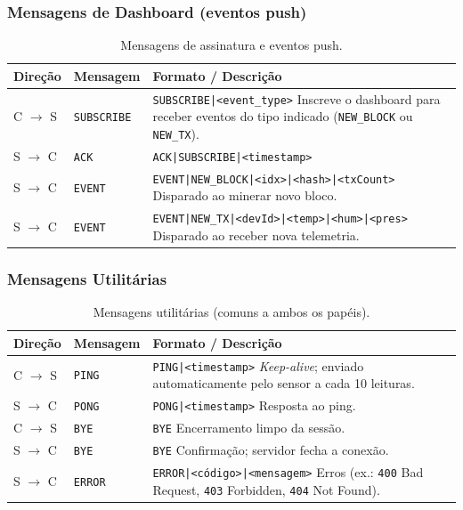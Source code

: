 \documentclass[12pt, a4paper]{article}
\begin{document}
\subsubsection{Mensagens de Dashboard (eventos push)}

\begin{table}[H]
\centering
\caption{Mensagens de assinatura e eventos push.}
\label{tab:dash-push}
\begin{tabularx}{\linewidth}{llX}
\toprule
\textbf{Direção} & \textbf{Mensagem} & \textbf{Formato / Descrição} \\
\midrule
C $\to$ S & \texttt{SUBSCRIBE}  & \texttt{SUBSCRIBE|<event\_type>} \newline Inscreve o dashboard para receber eventos do tipo indicado (\texttt{NEW\_BLOCK} ou \texttt{NEW\_TX}). \\
\addlinespace
S $\to$ C & \texttt{ACK}        & \texttt{ACK|SUBSCRIBE|<timestamp>} \\
\addlinespace
S $\to$ C & \texttt{EVENT}      & \texttt{EVENT|NEW\_BLOCK|<idx>|<hash>|<txCount>} \newline Disparado ao minerar novo bloco. \\
\addlinespace
S $\to$ C & \texttt{EVENT}      & \texttt{EVENT|NEW\_TX|<devId>|<temp>|<hum>|<pres>} \newline Disparado ao receber nova telemetria. \\
\bottomrule
\end{tabularx}
\end{table}

\subsubsection{Mensagens Utilitárias}

\begin{table}[H]
\centering
\caption{Mensagens utilitárias (comuns a ambos os papéis).}
\label{tab:util-msgs}
\begin{tabularx}{\linewidth}{llX}
\toprule
\textbf{Direção} & \textbf{Mensagem} & \textbf{Formato / Descrição} \\
\midrule
C $\to$ S & \texttt{PING}  & \texttt{PING|<timestamp>} \newline \emph{Keep-alive}; enviado automaticamente pelo sensor a cada 10 leituras. \\
S $\to$ C & \texttt{PONG}  & \texttt{PONG|<timestamp>} \newline Resposta ao ping. \\
\addlinespace
C $\to$ S & \texttt{BYE}   & \texttt{BYE} \newline Encerramento limpo da sessão. \\
S $\to$ C & \texttt{BYE}   & \texttt{BYE} \newline Confirmação; servidor fecha a conexão. \\
\addlinespace
S $\to$ C & \texttt{ERROR} & \texttt{ERROR|<código>|<mensagem>} \newline Erros (ex.: \texttt{400} Bad Request, \texttt{403} Forbidden, \texttt{404} Not Found). \\
\bottomrule
\end{tabularx}
\end{table}
\end{document}
